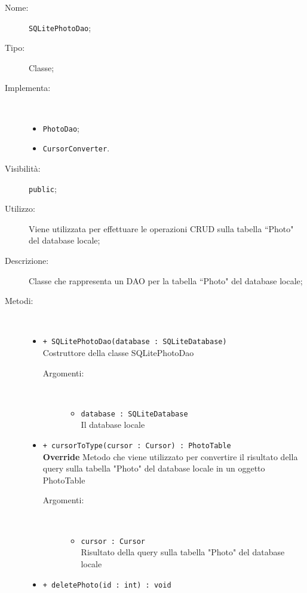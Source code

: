 \documentclass[../DefinizioneDiProdotto.tex]{subfiles}
\begin{document}
\begin{description}
	\item[Nome:] \texttt{SQLitePhotoDao};
	\item[Tipo:] Classe;
	\item[Implementa:] \
	\begin{itemize}
		\item \texttt{PhotoDao};
		
		\item \texttt{CursorConverter}.
		
	\end{itemize}
	\item[Visibilità:] \texttt{public};
	\item[Utilizzo:] Viene utilizzata per effettuare le operazioni CRUD sulla tabella “Photo" del database locale;
	\item[Descrizione:] Classe che rappresenta un DAO per la tabella “Photo" del database locale;
	\item[Metodi:] \
	\begin{itemize}
		\item \texttt{+ SQLitePhotoDao(database : SQLiteDatabase)}\\
		Costruttore della classe SQLitePhotoDao
		\begin{description}
			\item[Argomenti:] \
			\begin{itemize}
				\item \texttt{database : SQLiteDatabase}\\
				Il database locale\end{itemize}
		\end{description}
		\item \texttt{+ cursorToType(cursor : Cursor) : PhotoTable}\\
		\textbf{Override} Metodo che viene utilizzato per convertire il risultato della query sulla tabella "Photo" del database locale in un oggetto PhotoTable
		\begin{description}
			\item[Argomenti:] \
			\begin{itemize}
				\item \texttt{cursor : Cursor}\\
				Risultato della query sulla tabella "Photo" del database locale\end{itemize}
		\end{description}
		\item \texttt{+ deletePhoto(id : int) : void}\\

\end{itemize}
\end{description}
\end{document}
